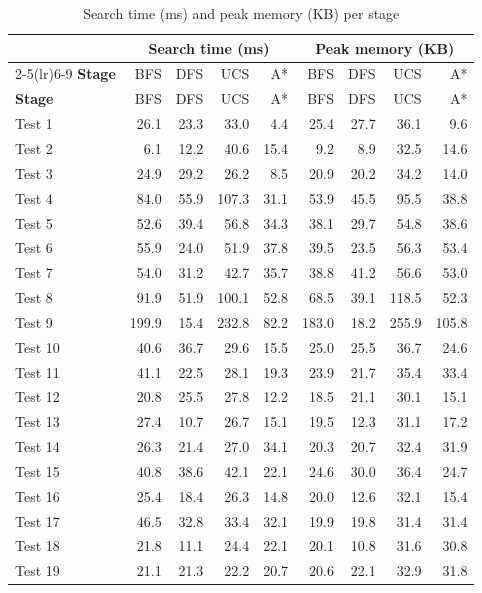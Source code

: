 \begin{longtable}{lrrrrrrrr}
\caption{Search time (ms) and peak memory (KB) per stage}\label{tab:perlevel-time}\\
\toprule
 & \multicolumn{4}{c}{\textbf{Search time (ms)}} & \multicolumn{4}{c}{\textbf{Peak memory (KB)}} \\
\cmidrule(lr){2-5}\cmidrule(lr){6-9}
\textbf{Stage} & BFS & DFS & UCS & A* & BFS & DFS & UCS & A* \\
\midrule
\endfirsthead
\toprule
\textbf{Stage} & BFS & DFS & UCS & A* & BFS & DFS & UCS & A* \\
\midrule
\endhead
\bottomrule
\endfoot
Test 1 & 26.1 & 23.3 & 33.0 & 4.4 & 25.4 & 27.7 & 36.1 & 9.6 \\
Test 2 & 6.1 & 12.2 & 40.6 & 15.4 & 9.2 & 8.9 & 32.5 & 14.6 \\
Test 3 & 24.9 & 29.2 & 26.2 & 8.5 & 20.9 & 20.2 & 34.2 & 14.0 \\
Test 4 & 84.0 & 55.9 & 107.3 & 31.1 & 53.9 & 45.5 & 95.5 & 38.8 \\
Test 5 & 52.6 & 39.4 & 56.8 & 34.3 & 38.1 & 29.7 & 54.8 & 38.6 \\
Test 6 & 55.9 & 24.0 & 51.9 & 37.8 & 39.5 & 23.5 & 56.3 & 53.4 \\
Test 7 & 54.0 & 31.2 & 42.7 & 35.7 & 38.8 & 41.2 & 56.6 & 53.0 \\
Test 8 & 91.9 & 51.9 & 100.1 & 52.8 & 68.5 & 39.1 & 118.5 & 52.3 \\
Test 9 & 199.9 & 15.4 & 232.8 & 82.2 & 183.0 & 18.2 & 255.9 & 105.8 \\
Test 10 & 40.6 & 36.7 & 29.6 & 15.5 & 25.0 & 25.5 & 36.7 & 24.6 \\
Test 11 & 41.1 & 22.5 & 28.1 & 19.3 & 23.9 & 21.7 & 35.4 & 33.4 \\
Test 12 & 20.8 & 25.5 & 27.8 & 12.2 & 18.5 & 21.1 & 30.1 & 15.1 \\
Test 13 & 27.4 & 10.7 & 26.7 & 15.1 & 19.5 & 12.3 & 31.1 & 17.2 \\
Test 14 & 26.3 & 21.4 & 27.0 & 34.1 & 20.3 & 20.7 & 32.4 & 31.9 \\
Test 15 & 40.8 & 38.6 & 42.1 & 22.1 & 24.6 & 30.0 & 36.4 & 24.7 \\
Test 16 & 25.4 & 18.4 & 26.3 & 14.8 & 20.0 & 12.6 & 32.1 & 15.4 \\
Test 17 & 46.5 & 32.8 & 33.4 & 32.1 & 19.9 & 19.8 & 31.4 & 31.4 \\
Test 18 & 21.8 & 11.1 & 24.4 & 22.1 & 20.1 & 10.8 & 31.6 & 30.8 \\
Test 19 & 21.1 & 21.3 & 22.2 & 20.7 & 20.6 & 22.1 & 32.9 & 31.8 \\

\end{longtable}

